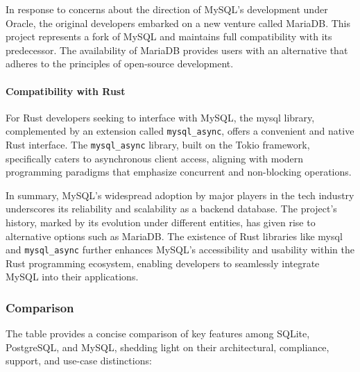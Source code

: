 In response to concerns about the direction of MySQL's development under Oracle, the original developers embarked on a new venture called MariaDB. This project 
represents a fork of MySQL and maintains full compatibility with its predecessor. The availability of MariaDB provides users with an alternative that adheres 
to the principles of open-source development.\newline

\paragraph{Compatibility with Rust}
For Rust developers seeking to interface with MySQL, the mysql library, complemented by an extension called \verb+mysql_async+, offers a convenient and native 
Rust interface. The \verb+mysql_async+ library, built on the Tokio framework, specifically caters to asynchronous client access, aligning with modern 
programming paradigms that emphasize concurrent and non-blocking operations.\newline

In summary, MySQL's widespread adoption by major players in the tech industry underscores its reliability and scalability as a backend database. The project's 
history, marked by its evolution under different entities, has given rise to alternative options such as MariaDB. The existence of Rust libraries like mysql 
and \verb+mysql_async+ further enhances MySQL's accessibility and usability within the Rust programming ecosystem, enabling developers to seamlessly integrate 
MySQL into their applications.

\subsubsection{Comparison}
The table provides a concise comparison of key features among SQLite, PostgreSQL, and MySQL, shedding light on their architectural, compliance, support, and 
use-case distinctions:

